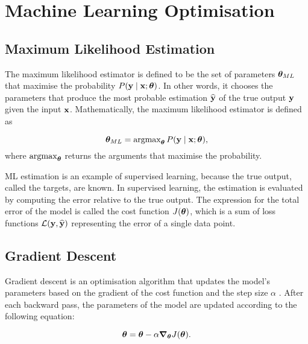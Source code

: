 \chapter{Machine Learning Optimisation}
\label{ch:optimisation}

\section{Maximum Likelihood Estimation}


The maximum likelihood estimator is defined to be the set of parameters $\mathrm{\boldsymbol{\theta}}_{ML}$ that maximise the probability $P(\bm{\mathrm{y}} \mid \bm{\mathrm{x}}; \mathrm{\boldsymbol{\theta}})$.
In other words, it chooses the parameters that produce the most probable estimation $\bm{\mathrm{\widehat{y}}}$ of the true output $\bm{\mathrm{y}}$ given the input $\bm{\mathrm{x}}$.
Mathematically, the maximum likelihood estimator is defined as

\begin{equation}\label{eq:Max_likelihood}
    \mathrm{\boldsymbol{\theta}}_{ML} = \operatorname{argmax}_{\mathrm{\boldsymbol{\theta}}} P(\bm{\mathrm{y}} \mid \bm{\mathrm{x}}; \mathrm{\boldsymbol{\theta}}),
\end{equation}
\noindent
where $\operatorname{argmax}_{\mathrm{\boldsymbol{\theta}}}$ returns the arguments that maximise the probability.

ML estimation is an example of supervised learning, because the true output, called the targets, are known.
In supervised learning, the estimation is evaluated by computing the error relative to the true output.
The expression for the total error of the model is called the cost function $J(\mathrm{\boldsymbol{\theta}})$,
which is a sum of loss functions $\mathcal{L}(\bm{\mathrm{y}},\bm{\mathrm{\widehat{y}}} )$ representing the error of a single data point.

\section{Gradient Descent}

Gradient descent is an optimisation algorithm that updates the model's parameters based on the gradient of the cost function and the step size $\alpha$ \cite{ruder2016overview}.
After each backward pass, the parameters of the model are updated according to the following equation:

\begin{equation}\label{eq:GD}
    \mathrm{\boldsymbol{\theta}} = \mathrm{\boldsymbol{\theta}} - \alpha \bm{\nabla_{\theta}} J(\mathrm{\boldsymbol{\theta}}).
\end{equation}

